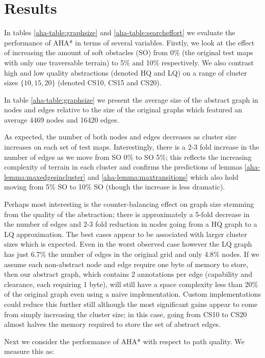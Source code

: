 \section{Results}
In tables \ref{aha-table:graphsize} and \ref{aha-table:searcheffort} we evaluate the performance of AHA* in terms of several variables. 
Firstly, we look at the effect of increasing the amount of soft obstacles (SO) from 0\% (the original test maps with only one traversable terrain) to 5\% and 10\% respectively. 
We also contrast high and low quality abstractions (denoted HQ and LQ) on a range of cluster sizes $\lbrace 10, 15, 20 \rbrace$ (denoted CS10, CS15 and CS20).
\par \indent
In table \ref{aha-table:graphsize} we present the average size of the abstract graph in nodes and edges relative to the size of the original graphs which featured an average 4469 nodes and 16420 edges. 

As expected, the number of both nodes and edges decreases as cluster size increases on each set of test maps. Interestingly, there is a 2-3 fold increase in the number of edges as we move from SO 0\% to SO 5\%; this reflects the increasing complexity of terrain in each cluster and confirms the predictions of lemmas \ref{aha-lemma:maxedgesincluster} and \ref{aha-lemma:maxtransitions} which also hold moving from 5\% SO to 10\% SO (though the increase is less dramatic). 
\par \indent
Perhaps most interesting is the counter-balancing effect on graph size stemming from the quality of the abstraction; there is approximately a 5-fold decrease in the number of edges and 2-3 fold reduction in nodes going from a HQ graph to a LQ approximation.
The best cases appear to be associated with larger cluster sizes which is expected. 
Even in the worst observed case however the LQ graph has just 6.7\% the number of edges in the original grid and only 4.8\% nodes. 
If we assume each non-abstract node and edge require one byte of memory to store, then our abstract graph, which contains 2 annotations per edge (capability and clearance, each requiring 1 byte), will still have a space complexity less than 20\% of the original graph even using a naive implementation. 
Custom implementations could reduce this further still although the most significant gains appear to come from simply increasing the cluster size; in this case, going from CS10 to CS20 almost halves the memory required to store the set of abstract edges.
\par \indent
Next we consider the performance of AHA* with respect to path quality. We measure this as:
